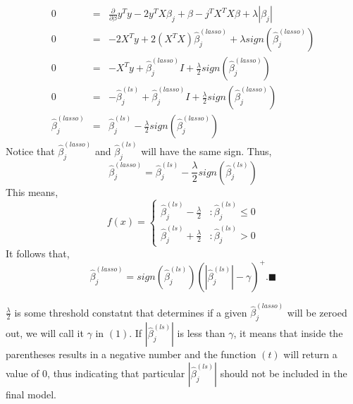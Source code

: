 \documentclass[a4paper]{article}
\begin{document}
\begin{eqnarray}
0 & = & \frac{\partial}{\partial\beta} y^{T}y - 2y^{T}X\beta_{j} + \beta-{j}^{T}X^{T}X\beta + \lambda |\beta_{j}| \nonumber \\
0 & = & -2X^{T}y + 2(X^{T}X)\hat{\beta}_{j}^{\left(lasso\right)} + \lambda sign\left(\hat{\beta}_{j}^{\left(lasso\right)}\right)  \nonumber \\
0 & = & -X^{T}y + \hat{\beta}_{j}^{\left(lasso\right)}I + \frac{\lambda}{2} sign\left(\hat{\beta}_{j}^{\left(lasso\right)}\right)  \nonumber \\ 
0 & = & -\hat{\beta}_{j}^{\left(ls\right)} + \hat{\beta}_{j}^{\left(lasso\right)}I + \frac{\lambda}{2} sign\left(\hat{\beta}_{j}^{\left(lasso\right)}\right) \nonumber \\
\hat{\beta}_{j}^{\left(lasso\right)} & = & \hat{\beta}_{j}^{\left(ls\right)} - \frac{\lambda}{2} sign\left(\hat{\beta}_{j}^{\left(lasso\right)}\right) \nonumber
\end{eqnarray}
\vspace{10pt}
Notice that $\hat{\beta}_{j}^{\left(lasso\right)}$ and $\hat{\beta}_{j}^{\left(ls\right)}$ will have the same sign. Thus,
\vspace{5pt}
\begin{equation*}
\hat{\beta}_{j}^{\left(lasso\right)} = \hat{\beta}_{j}^{\left(ls\right)} - \frac{\lambda}{2} sign\left(\hat{\beta}_{j}^{\left(ls\right)}\right) 
\end{equation*}
This means,
\begin{displaymath}
   f(x) = \left\{
     \begin{array}{lr}
      \hat{\beta}_{j}^{\left(ls\right)} - \frac{\lambda}{2} & : \hat{\beta}_{j}^{\left(ls\right)} \leq 0\\
      \hat{\beta}_{j}^{\left(ls\right)} + \frac{\lambda}{2} & : \hat{\beta}_{j}^{\left(ls\right)}  > 0
     \end{array}
   \right.
\end{displaymath}    
It follows that,
\begin{equation}
\hat{\beta}_{j}^{\left(lasso\right)} = sign\left(\hat{\beta}_{j}^{\left(ls\right)}\right)\left(|\hat{\beta}_{j}^{\left(ls\right)}|- \gamma\right)^{+}.\blacksquare
\end{equation}

$\frac{\lambda}{2}$ is some threshold constatnt that determines if a given $\hat{\beta}_{j}^{\left(lasso\right)}$ will be zeroed out, we will call it $\gamma$ in $\left(1\right)$. If $|\hat{\beta}_{j}^{\left(ls\right)}|$ is less than $\gamma$, it means that inside the parentheses results in a negative number and the function $(t)$ will return a value of $0$, thus indicating that particular $|\hat{\beta}_{j}^{\left(ls\right)}|$ should not be included in the final model.  
\end{document}

